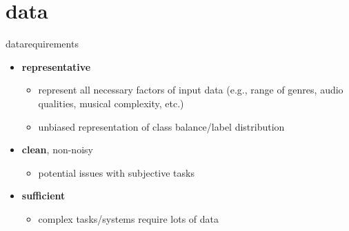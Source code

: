     \section{data}
        \begin{frame}{data}{requirements}
          
            \begin{itemize}
                \item   \textbf{representative}
                    \begin{itemize}
                        \item   represent all necessary factors of input data (e.g., range of genres, audio qualities, musical complexity, etc.)
                        \item   unbiased representation of class balance/label distribution
                    \end{itemize}
                \item   \textbf{clean}, non-noisy
                    \begin{itemize}
                        \item   potential issues with subjective tasks
                    \end{itemize}
                \item   \textbf{sufficient}
                    \begin{itemize}
                        \item   complex tasks/systems require lots of data
                    \end{itemize}
            \end{itemize}
        \end{frame}
        
